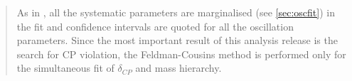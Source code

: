 \begin{frontmatter}
\begin{abstract}
As in \cite{OurRun1617b17cJointAnalysis3Flavour},
all the systematic parameters are marginalised (see \cref{sec:oscfit})
in the fit and 
confidence intervals are quoted for all the oscillation parameters.
Since the most important result of this analysis release is the search for CP violation,
the Feldman-Cousins method \cite{FeldmanCousins} is performed only for the simultaneous fit of $\delta_{CP}$ and mass hierarchy.


\end{abstract}

\end{frontmatter}

